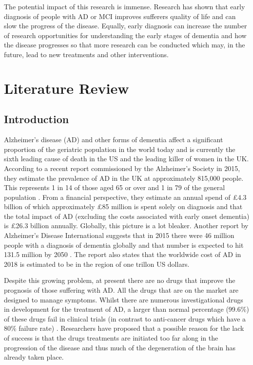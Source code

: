 \documentclass{article}
\begin{document}
\newline
\par
The potential impact of this research is immense. Research has shown that early diagnosis of people with AD or MCI improves sufferers quality of life and can slow the progress of the disease. Equally, early diagnosis can increase the number of research opportunities for understanding the early stages of dementia and how the disease progresses so that more research can be conducted which may, in the future, lead to new treatments and other interventions.
\section{Literature Review}
\subsection{Introduction}
\par
Alzheimer's disease (AD) and other forms of dementia affect a significant proportion of the geriatric population in the world today and is currently the sixth leading cause of death in the US and the leading killer of women in the UK. According to a recent report commissioned by the Alzheimer's Society in 2015, they estimate the prevalence of AD in the UK at approximately 815,000 people. This represents 1 in 14 of those aged 65 or over and 1 in 79 of the general population \cite{Sturrock2016}. From a financial perspective, they estimate an annual spend of £4.3 billion of which approximately £85 million is spent solely on diagnosis and that the total impact of AD (excluding the costs associated with early onset dementia) is £26.3 billion annually. Globally, this picture is a lot bleaker. Another report by Alzheimer's Disease International suggests that in 2015 there were 46 million people with a diagnosis of dementia globally and that number is expected to hit 131.5 million by 2050 \cite{Prince2015}. The report also states that the worldwide cost of AD in 2018 is estimated to be in the region of one trillon US dollars. \newline
\par
Despite this growing problem, at present there are no drugs that improve the prognosis of those suffering with AD. All the drugs that are on the market are designed to manage symptoms. Whilst there are numerous investigational drugs in development for the treatment of AD, a larger than normal percentage (99.6\%) of these drugs fail in clinical trials (in contrast to anti-cancer drugs which have a 80\% failure rate) \cite{Alzheimer2016}. Researchers have proposed that a possible reason for the lack of success is that the drugs treatments are initiated too far along in the progression of the disease and thus much of the degeneration of the brain has already taken place.  \newline
\end{document}
